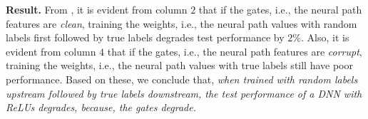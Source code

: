 \textbf{Result.} From , it is evident from column $2$ that if the gates, i.e., the neural path features are \emph{clean}, training the weights, i.e., the neural path values with random labels first followed by true labels degrades test performance by $2\%$. Also, it is evident from column $4$ that if the gates, i.e., the neural path features are \emph{corrupt}, training the weights, i.e., the neural path values with true labels still have poor performance. Based on these, we conclude that, \emph{when trained with random labels upstream followed by true labels downstream, the test performance of a DNN with ReLUs degrades, because, the gates degrade.}












